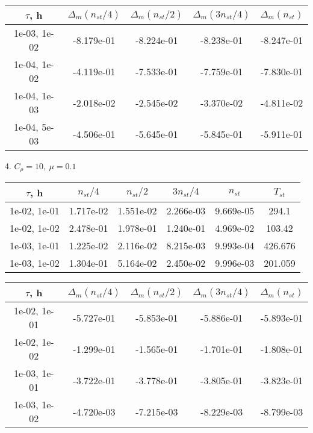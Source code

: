 \begin{center}
	\begin{tabular}{ |c|c|c|c|c| } 
		\hline
		$\tau$, h & $\Delta_m (n_{st}/ 4)$ & $\Delta_m (n_{st}/ 2)$ & $\Delta_m (3n_{st}/ 4)$ & $\Delta_m (n_{st})$ \\ 
		\hline
		1e-03, 1e-02 & -8.179e-01 & -8.224e-01 & -8.238e-01 & -8.247e-01 \\ 
		\hline
		1e-04, 1e-02 & -4.119e-01 & -7.533e-01 & -7.759e-01 & -7.830e-01 \\ 
		\hline
		1e-04, 1e-03 & -2.018e-02 & -2.545e-02 & -3.370e-02 & -4.811e-02 \\ 
		\hline
		1e-04, 5e-03 & -4.506e-01 & -5.645e-01 & -5.845e-01 & -5.911e-01 \\ 
		\hline
	\end{tabular}
\end{center}

4. $C_{\rho} = 10, \ \mu = 0.1$
\begin{center}
	\begin{tabular}{ |c|c|c|c|c|c| } 
		\hline
		$\tau$, h & $n_{st}/ 4$ & $n_{st}/ 2$ & $3n_{st}/ 4$ & $n_{st}$ & $T_{st}$ \\ 
		\hline
		1e-02, 1e-01 & 1.717e-02 & 1.551e-02 & 2.266e-03 & 9.669e-05 & 294.1\\ 
		\hline
		1e-02, 1e-02 & 2.478e-01 & 1.978e-01 & 1.240e-01 & 4.969e-02 & 103.42\\ 
		\hline
		1e-03, 1e-01 & 1.225e-02 & 2.116e-02 & 8.215e-03 & 9.993e-04 & 426.676\\ 
		\hline
		1e-03, 1e-02 & 1.304e-01 & 5.164e-02 & 2.450e-02 & 9.996e-03 & 201.059\\ 
		\hline
	\end{tabular}
\end{center}

\begin{center}
	\begin{tabular}{ |c|c|c|c|c| } 
		\hline
		$\tau$, h & $\Delta_m (n_{st}/ 4)$ & $\Delta_m (n_{st}/ 2)$ & $\Delta_m (3n_{st}/ 4)$ & $\Delta_m (n_{st})$ \\ 
		\hline
		1e-02, 1e-01 & -5.727e-01 & -5.853e-01 & -5.886e-01 & -5.893e-01 \\ 
		\hline
		1e-02, 1e-02 & -1.299e-01 & -1.565e-01 & -1.701e-01 & -1.808e-01 \\ 
		\hline
		1e-03, 1e-01 & -3.722e-01 & -3.778e-01 & -3.805e-01 & -3.823e-01 \\ 
		\hline
		1e-03, 1e-02 & -4.720e-03 & -7.215e-03 & -8.229e-03 & -8.799e-03 \\ 
		\hline
	\end{tabular}
\end{center}


